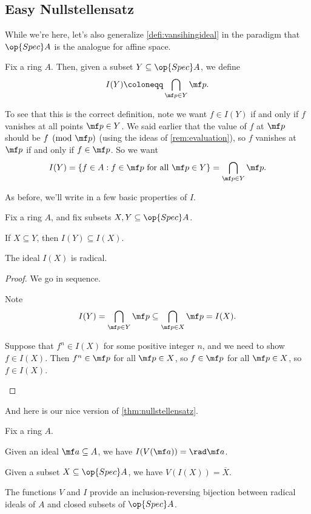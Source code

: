 \documentclass[../notes.tex]{subfiles}
\begin{document}
\subsection{Easy Nullstellensatz}
While we're here, let's also generalize \autoref{defi:vansihingideal} in the paradigm that $\op{Spec}A$ is the analogue for affine space.
\begin{definition}
	Fix a ring $A$. Then, given a subset $Y\subseteq\op{Spec}A$, we define
	\[I(Y)\coloneqq\bigcap_{\mf p\in Y}\mf p.\]
\end{definition}
\begin{remark}
	To see that this is the correct definition, note we want $f\in I(Y)$ if and only if $f$ vanishes at all points $\mf p\in Y$. We said earlier that the value of $f$ at $\mf p$ should be $f\pmod{\mf p}$ (using the ideas of \autoref{rem:evaluation}), so $f$ vanishes at $\mf p$ if and only if $f\in\mf p$. So we want
	\[I(Y)=\{f\in A:f\in\mf p\text{ for all }\mf p\in Y\}=\bigcap_{\mf p\in Y}\mf p.\]
\end{remark}
As before, we'll write in a few basic properties of $I$.
\begin{lemma} \label{lem:basiciprops}
	Fix a ring $A$, and fix subsets $X,Y\subseteq\op{Spec}A$.
	\begin{listalph}
		\item If $X\subseteq Y$, then $I(Y)\subseteq I(X)$.
		\item The ideal $I(X)$ is radical.
	\end{listalph}
\end{lemma}
\begin{proof}
	We go in sequence.
	\begin{listalph}
		\item Note
		\[I(Y)=\bigcap_{\mf p\in Y}\mf p\subseteq\bigcap_{\mf p\in X}\mf p=I(X).\]
		\item Suppose that $f^n\in I(X)$ for some positive integer $n$, and we need to show $f\in I(X)$. Then $f^n\in\mf p$ for all $\mf p\in X$, so $f\in\mf p$ for all $\mf p\in X$, so $f\in I(X)$.
		\qedhere
	\end{listalph}
\end{proof}
And here is our nice version of \autoref{thm:nullstellensatz}.
\begin{proposition} \label{prop:easynullstellensatz}
	Fix a ring $A$.
	\begin{listalph}
		\item Given an ideal $\mf a\subseteq A$, we have $I(V(\mf a))=\rad\mf a$.
		\item Given a subset $X\subseteq\op{Spec}A$, we have $V(I(X))=\overline X$.
		\item The functions $V$ and $I$ provide an inclusion-reversing bijection between radical ideals of $A$ and closed subsets of $\op{Spec}A$.
	\end{listalph}
\end{proposition}
\end{document}

